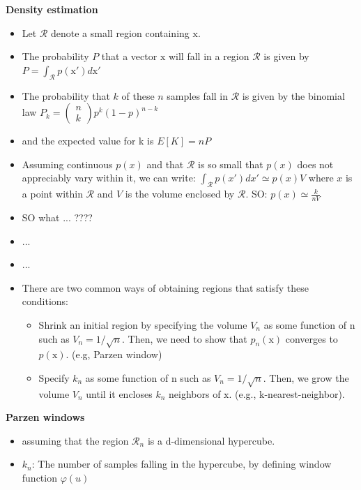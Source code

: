 \documentclass{../cheat}
\begin{document}
\begin{multicols}{3}
		\textbf{Density estimation}
		\begin{itemize}
			\item Let $\mathcal{R}$ denote a small region containing $\mathrm{x}$.
			\item The probability $P$ that a vector $\mathrm{x}$ will fall in a region $\mathcal{R}$ is given by $P=\int_\mathcal{R} p(\mathrm{x}')d\mathrm{x}'$
			\item The probability that $k$ of these $n$ samples fall in $\mathcal{R}$ is given by the binomial law $P_k=\left( \begin{array}{c} n \\ k \end{array} \right)p^k (1-p)^{n-k}$
			\item and the expected value for k is $E[K]=nP$
			\item Assuming continuous $p(x)$ and that $\mathcal{R}$ is so small that $p(x)$ does not appreciably vary within it, we can write:
				$\int_\mathcal{R} p(x')dx' \simeq p(x)V$
				where $x$ is a point within $\mathcal{R}$ and $V$ is the volume enclosed by $\mathcal{R}$.
				SO: $p(x) \simeq \frac{k}{nV}$
			\item SO what ... ????
			\item ...
			\item ...
			\item There are two common ways of obtaining regions that satisfy these conditions:
				\begin{itemize}
					\item Shrink an initial region by specifying the volume $V_n$ as some function of n such as $V_n = 1/\sqrt{n}$. Then, we need to show that $p_n(\mathrm{x})$ converges to $p(\mathrm{x})$. (e.g, Parzen window)
					\item Specify $k_n$ as some function of n such as $V_n = 1/\sqrt{n}$. Then, we grow the volume $V_n$ until it encloses $k_n$ neighbors of $\mathrm{x}$. (e.g., k-nearest-neighbor).
				\end{itemize}
		\end{itemize}
		
		
		\textbf{Parzen windows}
		\begin{itemize}
			\item assuming that the region $\mathcal{R}_n$ is a d-dimensional hypercube.
			\item $k_n$: The number of samples falling in the hypercube, by defining window function $\varphi(u)$
		\end{itemize}


\end{multicols}
\end{document}

